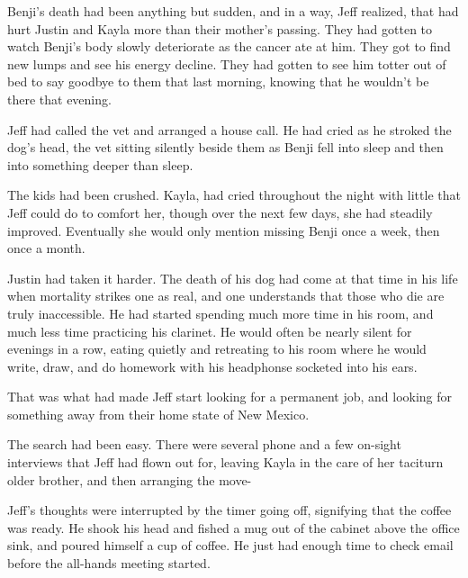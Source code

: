Benji's death had been anything but sudden, and in a way, Jeff realized, that had hurt Justin and Kayla more than their mother's passing.  They had gotten to watch Benji's body slowly deteriorate as the cancer ate at him.  They got to find new lumps and see his energy decline.  They had gotten to see him totter out of bed to say goodbye to them that last morning, knowing that he wouldn't be there that evening.

Jeff had called the vet and arranged a house call.  He had cried as he stroked the dog's head, the vet sitting silently beside them as Benji fell into sleep and then into something deeper than sleep.

The kids had been crushed.  Kayla, had cried throughout the night with little that Jeff could do to comfort her, though over the next few days, she had steadily improved.  Eventually she would only mention missing Benji once a week, then once a month.

Justin had taken it harder.  The death of his dog had come at that time in his life when mortality strikes one as real, and one understands that those who die are truly inaccessible.  He had started spending much more time in his room, and much less time practicing his clarinet.  He would often be nearly silent for evenings in a row, eating quietly and retreating to his room where he would write, draw, and do homework with his headphonse socketed into his ears.

That was what had made Jeff start looking for a permanent job, and looking for something away from their home state of New Mexico.

The search had been easy.  There were several phone and a few on-sight interviews that Jeff had flown out for, leaving Kayla in the care of her taciturn older brother, and then arranging the move-

Jeff's thoughts were interrupted by the timer going off, signifying that the coffee was ready.  He shook his head and fished a mug out of the cabinet above the office sink, and poured himself a cup of coffee.  He just had enough time to check email before the all-hands meeting started.
